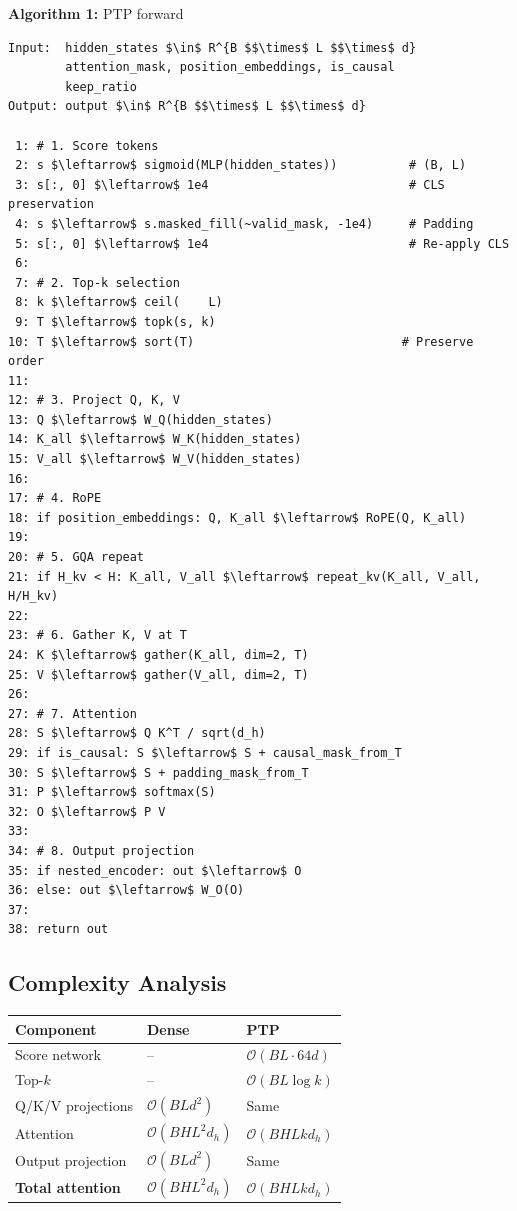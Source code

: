 \textbf{Algorithm 1:} PTP forward
\begin{lstlisting}
Input:  hidden_states $\in$ R^{B $$\times$ L $$\times$ d}
        attention_mask, position_embeddings, is_causal
        keep_ratio  
Output: output $\in$ R^{B $$\times$ L $$\times$ d}

 1: # 1. Score tokens
 2: s $\leftarrow$ sigmoid(MLP(hidden_states))          # (B, L)
 3: s[:, 0] $\leftarrow$ 1e4                            # CLS preservation
 4: s $\leftarrow$ s.masked_fill(~valid_mask, -1e4)     # Padding
 5: s[:, 0] $\leftarrow$ 1e4                            # Re-apply CLS
 6:
 7: # 2. Top-k selection
 8: k $\leftarrow$ ceil(    L)
 9: T $\leftarrow$ topk(s, k)
10: T $\leftarrow$ sort(T)                             # Preserve order
11:
12: # 3. Project Q, K, V
13: Q $\leftarrow$ W_Q(hidden_states)
14: K_all $\leftarrow$ W_K(hidden_states)
15: V_all $\leftarrow$ W_V(hidden_states)
16:
17: # 4. RoPE
18: if position_embeddings: Q, K_all $\leftarrow$ RoPE(Q, K_all)
19:
20: # 5. GQA repeat
21: if H_kv < H: K_all, V_all $\leftarrow$ repeat_kv(K_all, V_all, H/H_kv)
22:
23: # 6. Gather K, V at T
24: K $\leftarrow$ gather(K_all, dim=2, T)
25: V $\leftarrow$ gather(V_all, dim=2, T)
26:
27: # 7. Attention
28: S $\leftarrow$ Q K^T / sqrt(d_h)
29: if is_causal: S $\leftarrow$ S + causal_mask_from_T
30: S $\leftarrow$ S + padding_mask_from_T
31: P $\leftarrow$ softmax(S)
32: O $\leftarrow$ P V
33:
34: # 8. Output projection
35: if nested_encoder: out $\leftarrow$ O
36: else: out $\leftarrow$ W_O(O)
37:
38: return out
\end{lstlisting}

\subsection{Complexity Analysis}

\begin{table}[H]
\centering
\small
\begin{tabular}{lll}
\toprule
\textbf{Component} & \textbf{Dense} & \textbf{PTP} \\
\midrule
Score network & -- & $\mathcal{O}(B L \cdot 64 d)$ \\
Top-$k$ & -- & $\mathcal{O}(B L \log k)$ \\
Q/K/V projections & $\mathcal{O}(B L d^2)$ & Same \\
Attention & $\mathcal{O}(B H L^2 d_h)$ & \textbf{$\mathcal{O}(B H L k d_h)$} \\
Output projection & $\mathcal{O}(B L d^2)$ & Same \\
\textbf{Total attention} & $\mathcal{O}(B H L^2 d_h)$ & \textbf{$\mathcal{O}(B H L k d_h)$} \\
\bottomrule
\end{tabular}
\end{table}

